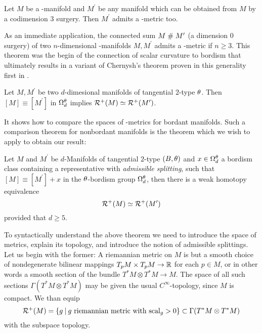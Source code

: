 \begin{theorem*}
    Let $M$ be a \psc-manifold and $M^\prime$ be any manifold which can be obtained from $M$ by a codimension $3$ surgery. Then $M^\prime$ admits a \psc-metric too.
\end{theorem*}
As an immediate application, the connected sum $M\mathrel\# M^\prime$ (a dimension $0$ surgery) of two $n$-dimensional \psc-manifolds $M,M^\prime$ admits a \psc-metric if $n\geq 3$.
This theorem was the begin of the connection of scalar curvature to bordism that ultimately results in a variant of Chernysh's theorem proven in this generality first in \cite{georg:diss}.
\begin{theorem*}[Chernysh, 2004]
    Let $M,M^\prime$ be two $d$-dimesional manifolds of tangential $2$-type $\theta$. 
    Then $[M]\equiv [M^\prime]$ in $\Omega_d^\theta$ implies $\mathcal{R}^+(M) \simeq \mathcal{R}^+(M^\prime)$.
\end{theorem*}
It shows how to compare the spaces of \psc-metrics for bordant manifolds. 
Such a comparison theorem for nonbordant manifolds is the 
theorem which we wish to apply to obtain our result:
\begin{theorem*}
    Let $M$ and $M^\prime$ be $d$-Manifolds of tangential $2$-type $(B,\theta)$ and $x\in \Omega_d^\theta$ a bordism class containing a representative with \emph{admissible splitting}, such that $[M] \equiv [M^\prime] + x$ in the $\theta$-bordism group $\Omega_d^\theta$, then there is a weak homotopy equivalence
    \begin{equation*}
        \mathcal{R}^+(M) \simeq \mathcal{R}^+(M^\prime)
    \end{equation*}
    provided that $d\geq 5$.
\end{theorem*}
To syntactically understand the above theorem we need to introduce the space of metrics, explain its topology, and introduce the notion of admissible splittings.
Let us begin with the former:
A riemannian metric on $M$ is but a smooth choice of nondegenerate bilinear mappings $T_pM\times T_p M\to \mathbb{R}$ for each $p\in M$, or in other words a smooth section of the bundle $T^\ast M \otimes T^\ast M \to M$.
The space of all such sections $\Gamma (T^\ast M \otimes T^\ast M)$ may be given the usual $C^\infty$-topology, since $M$ is compact.
We than equip
\begin{equation*}
    \mathcal{R}^+(M) = \{ g \:\vert\: g \text{ riemannian metric with } \mathrm{scal}_g > 0\} \subset \Gamma(T^\ast M \otimes T^\ast M )
\end{equation*}
with the subspace topology.
